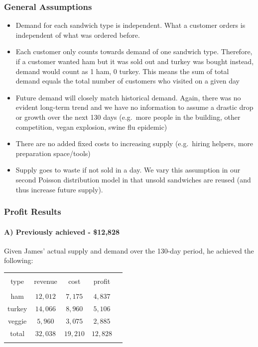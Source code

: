 \documentclass[]{article}
\begin{document}
\subsubsection{General Assumptions}\label{general-assumptions}

\begin{itemize}
\itemsep1pt\parskip0pt
\item
  Demand for each sandwich type is independent. What a customer orders
  is independent of what was ordered before.
\item
  Each customer only counts towards demand of one sandwich type.
  Therefore, if a customer wanted ham but it was sold out and turkey was
  bought instead, demand would count as 1 ham, 0 turkey. This means the
  sum of total demand equals the total number of customers who visited
  on a given day
\item
  Future demand will closely match historical demand. Again, there was
  no evident long-term trend and we have no information to assume a
  drastic drop or growth over the next 130 days (e.g.~more people in the
  building, other competition, vegan explosion, swine flu epidemic)
\item
  There are no added fixed costs to increasing supply (e.g.~hiring
  helpers, more preparation space/tools)
\item
  Supply goes to waste if not sold in a day. We vary this assumption in
  our second Poisson distribution model in that unsold sandwiches are
  reused (and thus increase future supply).
\end{itemize}

\subsubsection{Profit Results}\label{profit-results}

\paragraph{A) Previously achieved -
\$12,828}\label{a-previously-achieved---12828}

Given James' actual supply and demand over the 130-day period, he
achieved the following:

\begin{table}[!htbp]
  \label{} 
\begin{tabular}{@{\extracolsep{5pt}} ccccc} 
\\[-1.8ex]\hline 
\hline \\[-1.8ex] 
type & revenue & cost & profit \\ 
\hline \\[-1.8ex] 
ham & $12,012$ & $7,175$ & $4,837$ \\ 
turkey & $14,066$ & $8,960$ & $5,106$ \\ 
veggie & $5,960$ & $3,075$ & $2,885$ \\ 
total & $32,038$ & $19,210$ & $12,828$ \\ 
\hline \\[-1.8ex] 
\end{tabular} 
\end{table}
\end{document}
